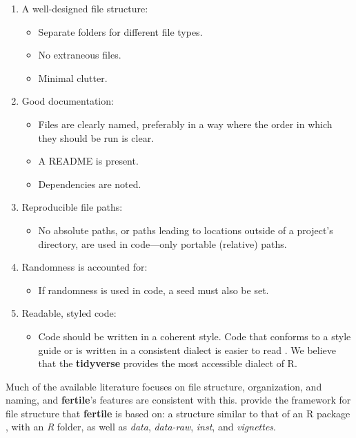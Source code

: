 \documentclass[APA,LATO1COL]{WileyNJD-v2}\usepackage[]{graphicx}\usepackage[]{color}
\newcommand{\R}{\textsf{R}\xspace}
\newcommand{\cmd}[1]{\textit{#1}}
\newcommand{\pkg}[1]{\textbf{#1}}
\begin{document}
\begin{enumerate} [nolistsep]
\item A well-designed file structure:
  \begin{itemize}[noitemsep]
  \item Separate folders for different file types.
  \item No extraneous files.
  \item Minimal clutter.
  \end{itemize}
\item Good documentation:
  \begin{itemize} [noitemsep]
  \item Files are clearly named, preferably in a way where the order in which they should be run is clear.
  \item A README is present.
  \item Dependencies are noted.
  \end{itemize}
\item Reproducible file paths:
  \begin{itemize}
  \item No absolute paths, or paths leading to locations outside of a project's directory, are used in code---only portable (relative) paths.
  \end{itemize}
\item Randomness is accounted for:
  \begin{itemize}
  \item If randomness is used in code, a seed must also be set.
  \end{itemize}
\item Readable, styled code:
  \begin{itemize}
  \item Code should be written in a coherent style. Code that conforms to a style guide or is written in a consistent dialect is easier to read \citep{hermans2017programming}. We believe that the \pkg{tidyverse} provides the most accessible dialect of \R.
  \end{itemize}
\end{enumerate}

Much of the available literature focuses on file structure, organization, and naming, and \pkg{fertile}'s features are consistent with this. \citet{marwick2018packaging} provide the framework for file structure that \pkg{fertile} is based on: a structure similar to that of an \R package \citep{coreteam-extensions, hadley-packages}, with an \cmd{R} folder, as well as \cmd{data}, \cmd{data-raw}, \cmd{inst}, and \cmd{vignettes}.
\end{document}
